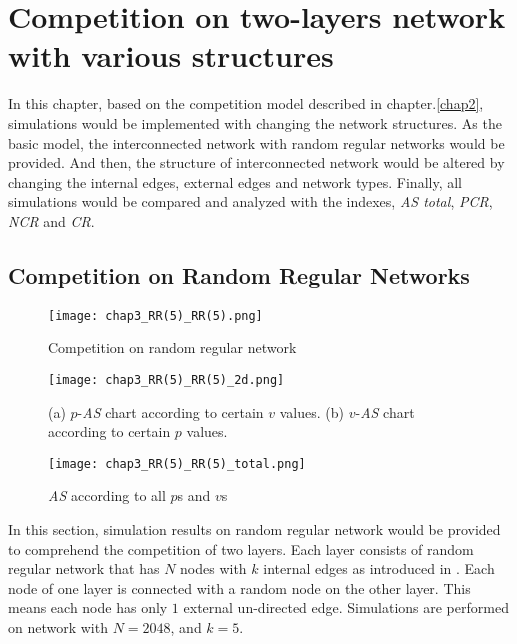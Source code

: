 

\chapter{Competition on two-layers network with various structures}
\label{chap3}
In this chapter, based on the competition model described in chapter.\ref{chap2}, simulations would be implemented with changing the network structures. As the basic model, the interconnected network with random regular networks would be provided. And then, the structure of interconnected network would be altered by changing the internal edges, external edges and network types. Finally, all simulations would be compared and analyzed with the indexes, \textit{AS total}, \textit{PCR}, \textit{NCR} and \textit{CR}.\\

\section{Competition on Random Regular Networks}
\label{competition on Random Regular Networks}
\begin{figure}[!htb]
	\centering
	\texttt{[image: chap3\_RR(5)\_RR(5).png]}
	\caption{Competition on random regular network}
	\label{chap3_RR(5)_RR(5)}
\end{figure}
\begin{figure}[!htb]
	\centering
	\texttt{[image: chap3\_RR(5)\_RR(5)\_2d.png]}
	\caption{(a) $p$-\textit{AS} chart according to certain $v$ values. (b) $v$-\textit{AS} chart according to certain $p$ values.}
	\label{chap3_RR(5)_RR(5)_2d}
\end{figure}
\begin{figure}[!htb]
	\centering
	\texttt{[image: chap3\_RR(5)\_RR(5)\_total.png]}
	\caption{\textit{AS} according to all $p$s and $v$s}
	\label{chap3_RR(5)_RR(5)_total}
\end{figure}
In this section, simulation results on random regular network would be provided to comprehend the competition of two layers. Each layer consists of random regular network that has $N$ nodes with $k$ internal edges as introduced in \parencite{kimsangwoo2012, choi2011, bela2001}. Each node of one layer is connected with a random node on the other layer. This means each node has only $1$ external un-directed edge. Simulations are performed on network with $N=2048$, and $k=5$.\\ 

